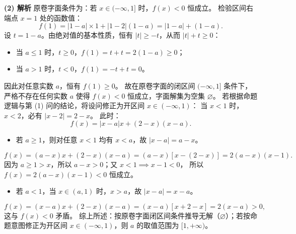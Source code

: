 \begin{answer}
\textbf{(2) 解析}
原卷字面条件为：若 $x \in (-\infty, 1]$ 时，$f(x) < 0$ 恒成立。
检验区间右端点 $x = 1$ 处的函数值：
\nopagebreak[4]
\[f(1) = |1 - a| \times 1 + |1 - 2|(1 - a) = |1 - a| + (1 - a).\]
设 $t = 1 - a$。由绝对值的基本性质，恒有 $|t| \geqslant -t$，从而 $|t| + t \geqslant 0$：
\begin{itemize}
\item 当 $a \leqslant 1$ 时，$t \geqslant 0$，$f(1) = t + t = 2(1 - a) \geqslant 0$；
\item 当 $a > 1$ 时，$t < 0$，$f(1) = -t + t = 0$。
\end{itemize}
因此对任意实数 $a$，恒有 $f(1) \geqslant 0$。
故在原卷字面的闭区间 $(-\infty, 1]$ 条件下，严格不存在任何实数 $a$ 使得 $f(x) < 0$ 恒成立，字面解集为空集 $\varnothing$。
若根据命题逻辑与第 (1) 问的结论，将设问修正为开区间 $x \in (-\infty, 1)$：
当 $x < 1$ 时，$x < 2$，必有 $|x - 2| = 2 - x$。
此时：
\nopagebreak[4]
\[f(x) = |x - a|x + (2 - x)(x - a).\]
\begin{itemize}
\item 若 $a \geqslant 1$，则对任意 $x < 1$ 均有 $x < a$，故 $|x - a| = a - x$。
\end{itemize}
\nopagebreak[4]
\[f(x) = (a - x)x + (2 - x)(x - a) = (a - x)[x - (2 - x)] = 2(a - x)(x - 1).\]
  因为 $a \geqslant 1 > x$，所以 $a - x > 0$；又 $x < 1 \implies x - 1 < 0$，
  所以 $f(x) = 2(a - x)(x - 1) < 0$ 恒成立。
\begin{itemize}
\item 若 $a < 1$，当 $x \in (a, 1)$ 时，$x > a$，故 $|x - a| = x - a$。
\end{itemize}
\nopagebreak[4]
\[f(x) = (x - a)x + (2 - x)(x - a) = (x - a)[x + 2 - x] = 2(x - a) > 0,\]
  这与 $f(x) < 0$ 矛盾。
综上所述：按原卷字面闭区间条件推导无解（$\varnothing$）；若按命题意图修正为开区间 $x \in (-\infty, 1)$，则 $a$ 的取值范围为 $[1, +\infty)$。


\gkanswer{答案（2）：按原卷字面条件无解（$\varnothing$）；若勘误为开区间 $x \in (-\infty, 1)$ 则 $a$ 的取值范围为 $[1, +\infty)$}

\end{answer}